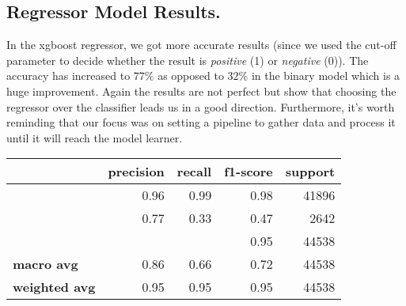 \documentclass{article}
\begin{document}
\subsection{Regressor Model Results.}
In the xgboost regressor, we got more accurate results (since we used the cut-off parameter to decide whether the result is \textit{positive} (1) or \textit{negative} (0)). The accuracy has increased to $77\%$ as opposed to $32\%$ in the binary model which is a huge improvement. Again the results are not perfect but show that choosing the regressor over the classifier leads us in a good direction. Furthermore, it's worth reminding that our focus was on setting a pipeline to gather data and process it until it will reach the model learner.
\begin{table}[H]
\begin{tabular}{lrrrr}
\hline
\rowcolor[HTML]{93C47D} 
\multicolumn{1}{|l|}{\cellcolor[HTML]{A4C2F4}}                  & \multicolumn{1}{l|}{\cellcolor[HTML]{93C47D}\textbf{precision}} & \multicolumn{1}{l|}{\cellcolor[HTML]{93C47D}\textbf{recall}} & \multicolumn{1}{l|}{\cellcolor[HTML]{93C47D}\textbf{f1-score}} & \multicolumn{1}{l|}{\cellcolor[HTML]{93C47D}\textbf{support}} \\ \hline
\rowcolor[HTML]{A2C4C9} 
\multicolumn{1}{|r|}{\cellcolor[HTML]{A4C2F4}\textbf{0}}        & \multicolumn{1}{r|}{\cellcolor[HTML]{A2C4C9}0.96}               & \multicolumn{1}{r|}{\cellcolor[HTML]{A2C4C9}0.99}            & \multicolumn{1}{r|}{\cellcolor[HTML]{A2C4C9}0.98}              & \multicolumn{1}{r|}{\cellcolor[HTML]{A2C4C9}41896}            \\ \hline
\rowcolor[HTML]{A2C4C9} 
\multicolumn{1}{|r|}{\cellcolor[HTML]{A4C2F4}\textbf{1}}        & \multicolumn{1}{r|}{\cellcolor[HTML]{A2C4C9}0.77}               & \multicolumn{1}{r|}{\cellcolor[HTML]{A2C4C9}0.33}            & \multicolumn{1}{r|}{\cellcolor[HTML]{A2C4C9}0.47}              & \multicolumn{1}{r|}{\cellcolor[HTML]{A2C4C9}2642}             \\ \hline
\rowcolor[HTML]{D9EAD3} 
\multicolumn{1}{|l|}{\cellcolor[HTML]{A4C2F4}\textbf{accuracy}} & \multicolumn{1}{l|}{\cellcolor[HTML]{D9EAD3}}                   & \multicolumn{1}{l|}{\cellcolor[HTML]{D9EAD3}}                & \multicolumn{1}{r|}{\cellcolor[HTML]{D9EAD3}0.95}              & \multicolumn{1}{r|}{\cellcolor[HTML]{D9EAD3}44538}            \\ \hline
\rowcolor[HTML]{D9EAD3} 
\cellcolor[HTML]{A4C2F4}\textbf{macro avg}                      & 0.86                                                            & 0.66                                                         & 0.72                                                           & 44538                                                         \\
\rowcolor[HTML]{D9EAD3} 
\cellcolor[HTML]{A4C2F4}\textbf{weighted avg}                   & 0.95                                                            & 0.95                                                         & 0.95                                                           & 44538                                                        
\end{tabular}
\end{table}
\end{document}
